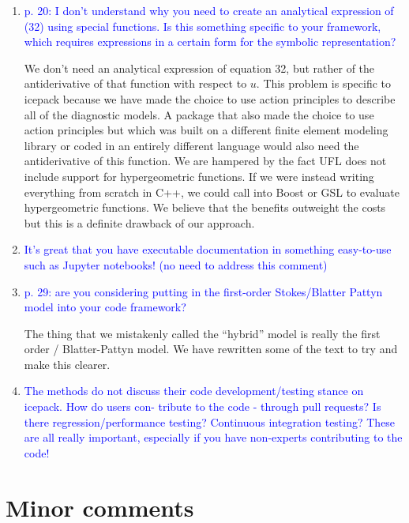 \documentclass{article}
\theoremstyle{definition}
\theoremstyle{plain}
\begin{document}
\begin{enumerate}
\item \textcolor{blue}{p. 20: I don't understand why you need to create an analytical expression of (32) using special
functions. Is this something specific to your framework, which requires expressions in a certain form
for the symbolic representation?}

We don't need an analytical expression of equation 32, but rather of the antiderivative of that function with respect to $u$.
This problem is specific to icepack because we have made the choice to use action principles to describe all of the diagnostic models.
A package that also made the choice to use action principles but which was built on a different finite element modeling library or coded in an entirely different language would also need the antiderivative of this function.
We are hampered by the fact UFL does not include support for hypergeometric functions.
If we were instead writing everything from scratch in C++, we could call into Boost or GSL to evaluate hypergeometric functions.
We believe that the benefits outweight the costs but this is a definite drawback of our approach.
\item \textcolor{blue}{It's great that you have executable documentation in something easy-to-use such as Jupyter notebooks! (no need to address this comment)}
\item \textcolor{blue}{p. 29: are you considering putting in the first-order Stokes/Blatter Pattyn model into your code
framework?}

The thing that we mistakenly called the ``hybrid'' model is really the first order / Blatter-Pattyn model.
We have rewritten some of the text to try and make this clearer.
\item \textcolor{blue}{The methods do not discuss their code development/testing stance on icepack. How do users con-
tribute to the code - through pull requests? Is there regression/performance testing? Continuous
integration testing? These are all really important, especially if you have non-experts contributing
to the code!}
\end{enumerate}

\section*{Minor comments}
\end{document}
